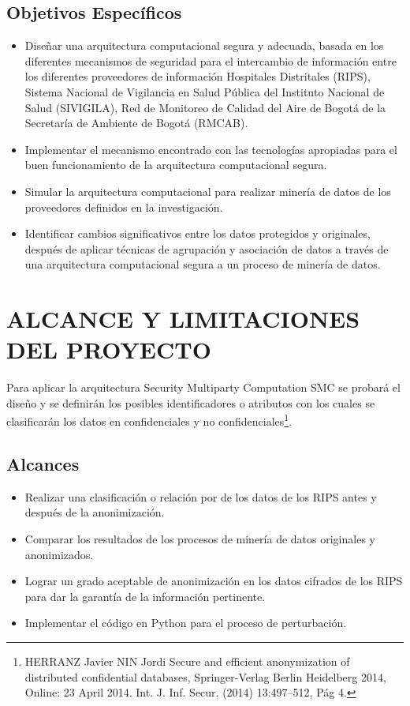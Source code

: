 \documentclass[a4paper,openright,12pt]{book}
\theoremstyle{definition}
\theoremstyle{remark}
\begin{document}
\subsection{Objetivos Específicos}
\begin{itemize}
\item Diseñar una arquitectura computacional segura y adecuada, basada en los diferentes mecanismos de seguridad para el intercambio de información entre los diferentes proveedores de información Hospitales Distritales (RIPS), Sistema Nacional de Vigilancia en Salud Pública del Instituto Nacional de Salud (SIVIGILA), Red de Monitoreo de Calidad del Aire de Bogotá de la Secretaría de Ambiente de Bogotá (RMCAB).
\item Implementar el mecanismo encontrado con las tecnologías apropiadas para el buen funcionamiento de la arquitectura computacional segura.
\item Simular la arquitectura computacional  para realizar minería de datos de los proveedores definidos en la investigación.
\item Identificar cambios significativos entre los datos protegidos y originales, después de aplicar técnicas de agrupación y asociación de datos a través de una arquitectura computacional segura a un proceso de minería de datos.

\end{itemize}

\section{ALCANCE Y LIMITACIONES DEL PROYECTO}

Para aplicar la arquitectura Security Multiparty Computation SMC se probará el  diseño y se definirán los posibles identificadores o atributos  con los cuales se clasificarán los datos en confidenciales y no confidenciales\footnote{HERRANZ Javier NIN Jordi Secure and efficient anonymization of distributed confidential databases, Springer-Verlag Berlin Heidelberg 2014, Online: 23 April 2014. Int. J. Inf. Secur. (2014) 13:497–512, Pág 4.}.


\subsection{Alcances}

\begin{itemize}
\item Realizar una clasificación o relación por de los datos de los RIPS antes y después de la anonimización.
\item Comparar los resultados de los procesos de minería de datos originales y anonimizados.
\item Lograr un grado aceptable de anonimización en los datos cifrados de los RIPS para dar la garantía de la información pertinente.
\item Implementar  el código en Python para el proceso de perturbación.
\end{itemize}
\end{document}
